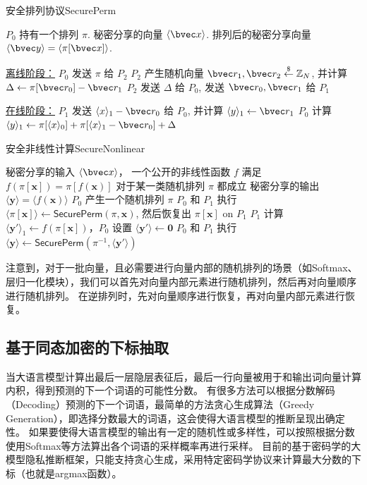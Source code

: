 \begin{algorithm}[H]
    \caption{安全排列协议\textsf{SecurePerm}}
    \label{alg:secure_perm}
    \begin{algorithmic}[1]
    \Require $P_0$ 持有一个排列 $\pi$. 秘密分享的向量 $\langle \bvec x \rangle$.
    \Ensure 排列后的秘密分享向量 $\langle \bvec y \rangle  = \langle \pi[\bvec x] \rangle$.
    \item[\underline{离线阶段：}]
    \State $P_0$ 发送 $\pi$ 给 $P_2$
    \State $P_2$ 产生随机向量 $\bvec r_1, \bvec r_2 \stackrel{\$}{\gets} \mathbb Z_N $, 并计算 $\Delta \gets \pi[\bvec r_0] - \bvec r_1$
    \State $P_2$ 发送 $\Delta$ 给 $P_0$, 发送 $\bvec r_0, \bvec r_1$ 给 $P_1$
    \item[\underline{在线阶段：}]
    \State $P_1$ 发送 $\langle x \rangle_1 - \bvec r_0$ 给 $P_0$, 并计算 $\langle y \rangle_1 \gets \bvec r_1$
    \State $P_0$ 计算 $\langle y \rangle_1 \gets \pi[\langle x \rangle_0] + \pi[\langle x \rangle_1 - \bvec r_0] + \Delta$
    \end{algorithmic}
\end{algorithm}

\begin{algorithm}[h]
\caption{安全非线性计算\textsf{SecureNonlinear}}
\label{alg:perm-llm:nonlinear}
\begin{algorithmic}[1]
\Require  
    秘密分享的输入 $\langle \bvec x \rangle$，
    一个公开的非线性函数 $f$ 满足 $f(\pi[\mathbf x]) = \pi[f(\mathbf x)]$ 对于某一类随机排列 $\pi$ 都成立
\Ensure 秘密分享的输出 $\langle \mathbf y \rangle = \langle f(\mathbf x) \rangle$
\State $P_0$ 产生一个随机排列 $\pi$
\State $P_0$ 和 $P_1$ 执行 $\langle \pi[\mathbf x] \rangle \gets \mathsf{SecurePerm}(\pi, \mathbf x)$, 然后恢复出 $\pi[\mathbf x]$ on $P_1$
\State $P_1$ 计算 $\langle \mathbf y' \rangle_1 \gets f(\pi[\mathbf x])$，$P_0$ 设置 $\langle \mathbf y' \rangle \gets \mathbf 0$
\State $P_0$ 和 $P_1$ 执行 $\langle \mathbf y \rangle \gets \mathsf{SecurePerm}(\pi^{-1}, \langle \mathbf y' \rangle)$
\end{algorithmic}
\end{algorithm}

注意到，对于一批向量，且必需要进行向量内部的随机排列的场景（如Softmax、层归一化模块），我们可以首先对向量内部元素进行随机排列，然后再对向量顺序进行随机排列。
%
在逆排列时，先对向量顺序进行恢复，再对向量内部元素进行恢复。
%

\subsection{基于同态加密的下标抽取}
当大语言模型计算出最后一层隐层表征后，最后一行向量被用于和输出词向量计算内积，得到预测的下一个词语的可能性分数。
%
有很多方法可以根据分数解码（Decoding）预测的下一个词语，最简单的方法贪心生成算法（Greedy Generation），即选择分数最大的词语，这会使得大语言模型的推断呈现出确定性。
%
如果要使得大语言模型的输出有一定的随机性或多样性，可以按照根据分数使用Softmax等方法算出各个词语的采样概率再进行采样。
%
目前的基于密码学的大模型隐私推断框架，只能支持贪心生成，采用特定密码学协议来计算最大分数的下标（也就是argmax函数）。
%

